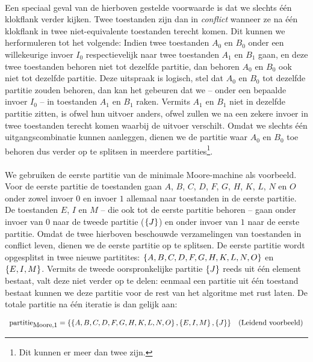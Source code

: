 \paragraph{}
Een speciaal geval van de hierboven gestelde voorwaarde is dat we slechts \'e\'en klokflank verder kijken. Twee toestanden zijn dan in \emph{conflict} wanneer ze na \'e\'en klokflank in twee niet-equivalente toestanden terecht komen. Dit kunnen we herformuleren tot het volgende: Indien twee toestanden $A_0$ en $B_0$ onder een willekeurige invoer $I_0$ respectievelijk naar twee toestanden $A_1$ en $B_1$ gaan, en deze twee toestanden behoren niet tot dezelfde partitie, dan behoren $A_0$ en $B_0$ ook niet tot dezelfde partitie. Deze uitspraak is logisch, stel dat $A_0$ en $B_0$ tot dezelfde partitie zouden behoren, dan kan het gebeuren dat we -- onder een bepaalde invoer $I_0$ -- in toestanden $A_1$ en $B_1$ raken. Vermits $A_1$ en $B_1$ niet in dezelfde partitie zitten, is ofwel hun uitvoer anders, ofwel zullen we na een zekere invoer in twee toestanden terecht komen waarbij de uitvoer verschilt. Omdat we slechts \'e\'en uitgangscombinatie kunnen aanleggen, dienen we de partitie waar $A_0$ en $B_0$ toe behoren dus verder op te splitsen in meerdere partities\footnote{Dit kunnen er meer dan twee zijn.}.

\paragraph{}
We gebruiken de eerste partitie van de minimale Moore-machine als voorbeeld. Voor de eerste partitie de toestanden gaan $A$, $B$, $C$, $D$, $F$, $G$, $H$, $K$, $L$, $N$ en $O$ onder zowel invoer $0$ en invoer $1$ allemaal naar toestanden in de eerste partitie. De toestanden $E$, $I$ en $M$ -- die ook tot de eerste partitie behoren  --  gaan onder invoer van $0$ naar de tweede partitie ($\left\{ J \right\}$) en onder invoer van $1$ naar de eerste partitie. Omdat de twee hierboven beschouwde verzamelingen van toestanden in conflict leven, dienen we de eerste partitie op te splitsen. De eerste partitie wordt opgesplitst in twee nieuwe partitites: $\left\{ A,B,C,D,F,G,H,K,L,N,O \right\}$ en $\left\{ E,I,M \right\}$. Vermits de tweede oorspronkelijke partitie $\left\{ J \right\}$ reeds uit \'e\'en element bestaat, valt deze niet verder op te delen: eenmaal een partitie uit \'e\'en toestand bestaat kunnen we deze partitie voor de rest van het algoritme met rust laten. De totale partitie na \'e\'en iteratie is dan gelijk aan:

\begin{equation}
\begin{array}{lr}
\mbox{partitie}_{\mbox{\small{Moore,1}}}=\left\{ \left\{ A,B,C,D,F,G,H,K,L,N,O \right\},\left\{ E,I,M \right\},\left\{ J \right\} \right\}&\mbox{(Leidend voorbeeld)}
\end{array}
\end{equation}

